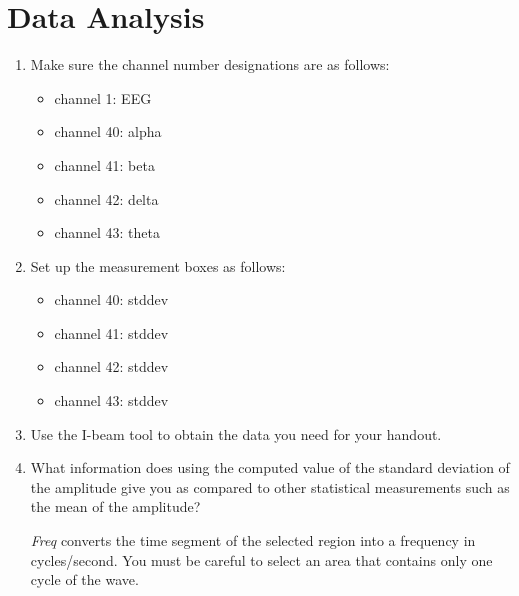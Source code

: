 \documentclass{article}
\begin{document}
\section*{Data Analysis}
\begin{enumerate}
	\item Make sure the channel number designations are as follows:
		\begin{itemize}
			\item channel 1: EEG
			\item channel 40: alpha
			\item channel 41: beta
			\item channel 42: delta
			\item channel 43: theta
		\end{itemize}
		
	\item Set up the measurement boxes as follows:\begin{itemize}
		\item channel 40: stddev
		\item channel 41: stddev
		\item channel 42: stddev
		\item channel 43: stddev
	\end{itemize}
	
	\item Use the I-beam tool to obtain the data you need for your handout.
	\item What information does using the computed value of the standard deviation of the amplitude give you as compared to other statistical measurements such as the mean of the amplitude?
	\begin{info}
		\textit{Freq} converts the time segment of the selected region into a frequency in cycles/second. You must be careful to select an area that contains only one cycle of the wave.
	\end{info}
	

\end{enumerate}
\end{document}
